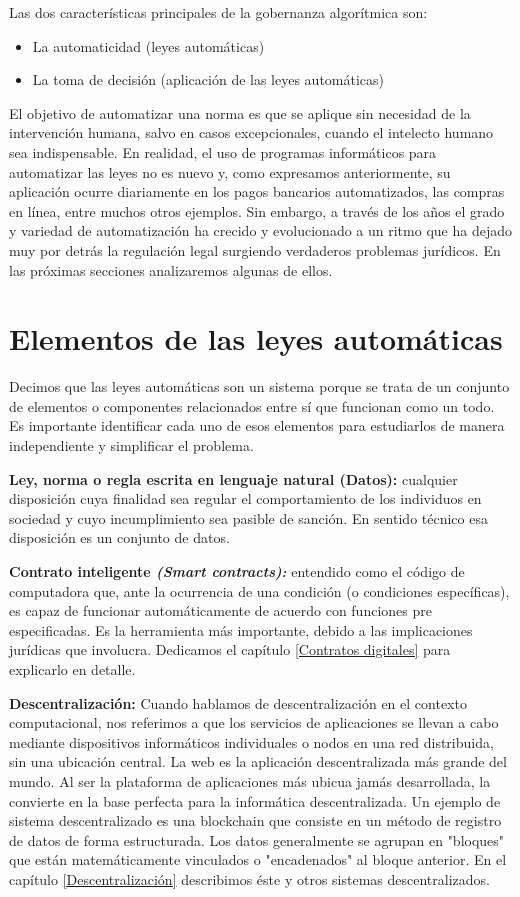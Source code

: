 \documentclass[12pt]{report} %
\begin{document}
Las dos características principales de la gobernanza algorítmica son:

\begin{itemize}
    \item La automaticidad (leyes automáticas)
    
    \item La toma de decisión (aplicación de las leyes automáticas)
\end{itemize}

El objetivo de automatizar una norma es que se aplique sin necesidad de la intervención humana, salvo en casos excepcionales, cuando el intelecto humano sea indispensable. En realidad, el uso de programas informáticos para automatizar las leyes no es nuevo y, como expresamos anteriormente, su aplicación ocurre diariamente en los pagos bancarios automatizados, las compras en línea, entre muchos otros ejemplos. Sin embargo, a través de los años el grado y variedad de automatización ha crecido y evolucionado a un ritmo que ha dejado muy por detrás la regulación legal surgiendo verdaderos problemas jurídicos. En las próximas secciones analizaremos algunas de ellos.

\section{Elementos de las leyes automáticas}


Decimos que las leyes automáticas son un sistema porque se trata de un conjunto de elementos o componentes relacionados entre sí que funcionan como un todo. Es importante identificar cada uno de esos elementos para estudiarlos de manera independiente y simplificar el problema.

\textbf{Ley, norma o regla escrita en lenguaje natural (Datos):} cualquier disposición cuya finalidad sea regular el comportamiento de los individuos en sociedad y cuyo incumplimiento sea pasible de sanción. En sentido técnico esa disposición es un conjunto de datos. 

\textbf{Contrato inteligente \textit{(Smart contracts):}} entendido como el código de computadora que, ante la ocurrencia de una condición (o condiciones específicas), es capaz de funcionar automáticamente de acuerdo con funciones pre especificadas. Es la herramienta más importante, debido a las implicaciones jurídicas que involucra. Dedicamos el capítulo \ref{Contratos digitales} para explicarlo en detalle. 

\textbf{Descentralización:} Cuando hablamos de descentralización en el contexto computacional, nos referimos a que los servicios de aplicaciones se llevan a cabo mediante dispositivos informáticos individuales o nodos en una red distribuida, sin una ubicación central.  La web es la aplicación descentralizada más grande del mundo. Al ser la plataforma de aplicaciones más ubicua jamás desarrollada, la convierte en la base perfecta para la informática descentralizada. Un ejemplo de sistema descentralizado es una blockchain que consiste en un método de registro de datos de forma estructurada. Los datos generalmente se agrupan en "bloques" que están matemáticamente vinculados o "encadenados" al bloque anterior. En el capítulo \ref{Descentralización} describimos éste y otros sistemas descentralizados.
\end{document}
